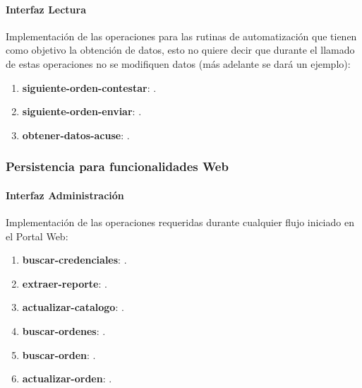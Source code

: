 \paragraph{\indent Interfaz Lectura\\}
Implementación de las operaciones para las rutinas de automatización que tienen como objetivo la obtención de datos, esto no quiere decir que durante el llamado de estas operaciones no se modifiquen datos (más adelante se dará un ejemplo):
\begin{enumerate}
	\item \textbf{siguiente-orden-contestar}: .
	\item \textbf{siguiente-orden-enviar}: .
	\item \textbf{obtener-datos-acuse}: .
\end{enumerate}

\subsubsection{Persistencia para funcionalidades Web}

\paragraph{\indent Interfaz Administración\\}
Implementación de las operaciones requeridas durante cualquier flujo iniciado en el Portal Web:
\begin{enumerate}
	\item \textbf{buscar-credenciales}: .
	\item \textbf{extraer-reporte}: .
	\item \textbf{actualizar-catalogo}: .
	\item \textbf{buscar-ordenes}: .
	\item \textbf{buscar-orden}: .
	\item \textbf{actualizar-orden}: .
\end{enumerate}

